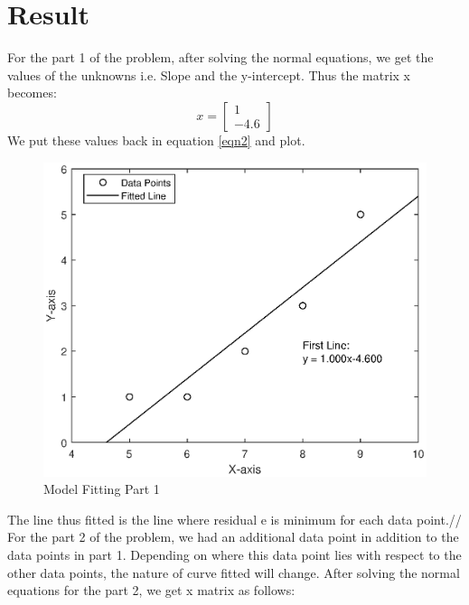 \documentclass{article}
\begin{document}
\section{\centering Result}\label{sec:code}
For the part 1 of the problem, after solving the normal equations, we get the values of the unknowns i.e. Slope and the y-intercept. Thus the matrix x becomes:
\begin{equation}
x=
\begin{bmatrix}
1\\-4.6
\end{bmatrix}
\end{equation}
We put these values back in equation \ref{eqn2} and plot.\\
\begin{figure}[!htb]
\centering
\includegraphics[scale=0.75]{part1.eps}
\caption{Model Fitting Part 1}
\label{fig:part1}
\end{figure}
 The line thus fitted is the line where residual e is minimum for each data point.//
For the part 2 of the problem, we had an additional data point in addition to the data points in part 1. Depending on where this data point lies with respect to the other data points, the nature of curve fitted will change.
After solving the normal equations for the part 2, we get x matrix as follows:
\end{document}
